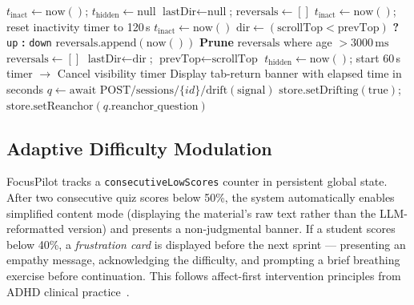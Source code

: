\documentclass[conference]{IEEEtran}
\begin{document}
\begin{algorithm}
\caption{Behavioral Drift Detection}
\label{alg:drift}
\begin{algorithmic}[1]
\State $t_{\text{inact}} \gets \text{now}()$; $t_{\text{hidden}} \gets \text{null}$
\State $\text{lastDir} \gets \text{null}$; $\text{reversals} \gets []$
 
  \State $t_{\text{inact}} \gets \text{now}()$; reset inactivity timer to 120\,s
\EndProcedure
{}
  \State $t_{\text{inact}} \gets \text{now}()$ 
  \State $\text{dir} \gets (\text{scrollTop} < \text{prevTop})$ \textbf{?} \texttt{up} \textbf{:} \texttt{down}
    \State $\text{reversals}.\text{append}(\text{now}())$
    \State \textbf{Prune} $\text{reversals}$ where age $> 3000\,\text{ms}$
      \State $\text{reversals} \gets []$
      \State {}
    \EndIf
  \EndIf
  \State $\text{lastDir} \gets \text{dir}$; $\text{prevTop} \gets \text{scrollTop}$
\EndProcedure
{}
  \State $t_{\text{hidden}} \gets \text{now}()$; start 60\,s timer $\to$ 
\EndProcedure
{}
  \State Cancel visibility timer
    \State Display tab-return banner with elapsed time in seconds
  \EndIf
\EndProcedure
{}
   \Return \EndIf
  \State $q \gets \text{await POST}/\text{sessions}/\{id\}/\text{drift}(\text{signal})$
  \State $\text{store.setDrifting}(\text{true})$; $\text{store.setReanchor}(q.\text{reanchor\_question})$
\EndProcedure
\end{algorithmic}
\end{algorithm}

\subsection{Adaptive Difficulty Modulation}

FocusPilot tracks a \texttt{consecutiveLowScores} counter in persistent global state. After two consecutive quiz scores below 50\%, the system automatically enables simplified content mode (displaying the material's raw text rather than the LLM-reformatted version) and presents a non-judgmental banner. If a student scores below 40\%, a \textit{frustration card} is displayed before the next sprint — presenting an empathy message, acknowledging the difficulty, and prompting a brief breathing exercise before continuation. This follows affect-first intervention principles from ADHD clinical practice~\cite{shaw2014emotion}.
\end{document}
